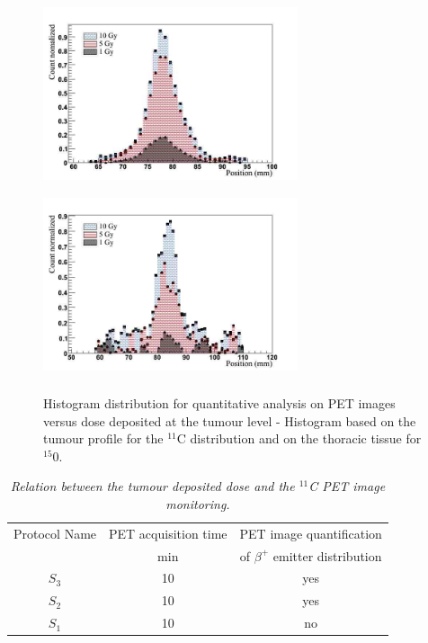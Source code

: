 \documentclass[11pt]{iopart}
\begin{document}
\begin{figure}[!h]
\begin{center}
\includegraphics[width=75mm,height=55mm]{figures/histo_lung_C11_paper.jpg}
\includegraphics[width=75mm,height=55mm]{figures/histo_lung_O15_paper.jpg}
\caption{Histogram distribution for quantitative analysis on PET images versus dose deposited at the tumour level - Histogram based on the tumour profile for the $^{11}$C distribution and on the thoracic tissue for $^{15}$0.}
\end{center}
\label{fig:fig4}
\end{figure}

\begin{table}[htbp]
\begin{center}
\begin{tabular}{|c|c|c|} \hline
 Protocol Name  & PET acquisition time  & PET image quantification       \\
                              &  min                  & of $\beta^{+}$ emitter distribution       \\ \hline \hline
 
$S_{3}$              & 10                    &  yes                           \\ \hline
$S_{2}$              & 10                    &  yes                           \\ \hline
$S_{1}$              & 10                    &  no                            \\ \hline \hline 

\end{tabular}
\end{center} 
\caption{\it Relation between the tumour deposited dose and the $^{11}$C PET image monitoring.}
\label{tab:results}
\end{table}
\end{document}
